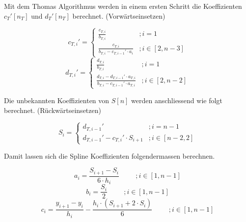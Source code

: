 \documentclass[12pt,titlepage]{article}
\begin{document}
Mit dem Thomas Algorithmus werden in einem ersten Schritt die Koeffizienten $c_T'[n_T]$ und $d_T'[n_T]$ berechnet. (Vorwärtseinsetzen)
\newline

\begin{equation*}
    c_{T,i}' =
    \begin{cases}
        \frac{c_{T,i}}{b_{T,i}} & ;i=1\\
        \frac{c_{T,i}}{b_{T,i}-c_{T,i-1}'\cdot a_i} & ;i\in [2,n-3]
    \end{cases}
\end{equation*}
\newline
\begin{equation}
    d_{T,i}' = 
    \begin{cases}
        \frac{d_{T,i}}{b_{T,i}} & ;i=1\\
        \frac{d_{T,i}-d_{T,i-1}'\cdot a_{T,i}}{b_{T,i}-c_{T,i-1}'\cdot a_{T,i}} & ;i\in [2,n-2]
    \end{cases}
\end{equation}
\newpage

Die unbekannten Koeffizienten von $S[n]$ werden anschliessend wie folgt berechnet. (Rückwärtseinsetzen)
\newline

\begin{equation}
    S_{i} =
    \begin{cases}
        d_{T,i-1}' & ;i=n-1\\
        d_{T,i-1}'-c_{T,i}'\cdot S_{i+1} & ;i\in [n-2,2]
    \end{cases}
\end{equation}
\newline

Damit lassen sich die Spline Koeffizienten folgendermassen berechnen.
\newline

\begin{equation*}
    a_i = \frac{S_{i+1}-S_i}{6\cdot h_i} \hspace{1cm} ;i\in [1,n-1]
\end{equation*}
\begin{equation*}
    b_i = \frac{S_i}{2} \hspace{1cm} ;i\in [1,n-1]
\end{equation*}
\begin{equation}
    c_i = \frac{y_{i+1}-y_i}{h_i}-\frac{h_i\cdot (S_{i+1}+2\cdot S_i)}{6} \hspace{1cm} ;i\in [1,n-1]
\end{equation}
\newline
\end{document}
